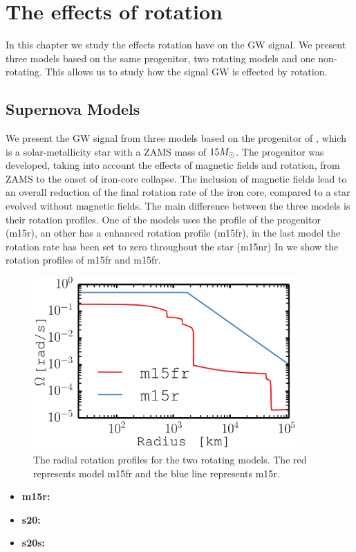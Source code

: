 
\chapter{The effects of rotation}
In this chapter we study the effects rotation have on the GW signal. 
We present three models based on the same progenitor, two rotating models and one non-rotating.
This allows us to study how the signal GW is effected by rotation. 


\section{Supernova Models}
We present the GW signal from three models based on the progenitor of
\cite{heger_05}, which is a solar-metallicity star with a ZAMS mass of $15 {M_\odot}$.
The progenitor was developed, taking into account the effects of magnetic fields and rotation,
from ZAMS to the onset of iron-core collapse. The inclusion of magnetic fields lead to an overall
reduction of the final rotation rate of the iron core, compared to a star evolved without magnetic
fields. The main difference between the three models is their rotation profiles. One of the models
uses the profile of the progenitor (m15r), an other has a enhanced rotation profile (m15fr),
in the last model the rotation rate has been set to zero throughout the star (m15nr)
In  we show the rotation profiles of m15fr and m15fr.
\begin{figure}           
\centering                            
\includegraphics[width=0.9\textwidth]{./images/paper2/rot.pdf}
\caption{The radial rotation profiles for the two rotating models. The red represents model 
m15fr and the blue line represents m15r. \label{figp2:rot}}
\end{figure}
\begin{itemize}
\item \textbf{m15r:} 
\item \textbf{s20:}
\item \textbf{s20s:} 
\end{itemize}
